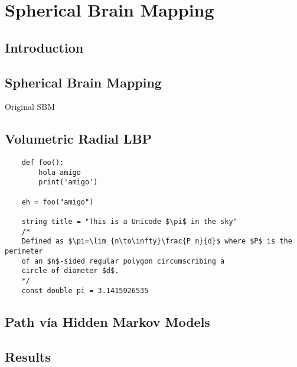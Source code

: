 \chapter{Spherical Brain Mapping}\label{ch:sbm}
\section{Introduction}
\section{Spherical Brain Mapping}
Original \ac{SBM}
\cite{Martinez-Murcia2014225,Martinez-Murcia201519,Martinez-Murcia2016,Martinez-Murcia2016hbm}
\section{Volumetric Radial LBP}
\lstset{language=python} 
\begin{lstlisting}
	def foo():
		hola amigo
		print('amigo')
	
	eh = foo("amigo")
	
	string title = "This is a Unicode $\pi$ in the sky"
	/*
	Defined as $\pi=\lim_{n\to\infty}\frac{P_n}{d}$ where $P$ is the perimeter
	of an $n$-sided regular polygon circumscribing a
	circle of diameter $d$.
	*/
	const double pi = 3.1415926535
\end{lstlisting}
\section{Path vía Hidden Markov Models}

\section{Results}